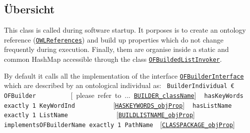 \subsection{Übersicht}
This class is called during software startup. It porposes is to create an ontology reference (\texttt{\hyperlink{ontologyFramework.OFContextManagement.OWLReferences-class}{OWLReferences}})
 and build up properties which do not change frequently during execution. 
 Finally, them are organise inside a static and common HashMap accessible through the
 class \texttt{\hyperlink{ontologyFramework.OFRunning.OFInvokingManager.OFBuildedListInvoker-class}{OFBuildedListInvoker}}.
 \par 
 By default it calls all the implementation of the interface \texttt{\hyperlink{ontologyFramework.OFRunning.OFInitialising.OFBuilderInterface<T>-class}{OFBuilderInterface}}
 which are described by an ontological individual as:
 {\ttfamily
\mbox{ }\verb!BuilderIndividual € OFBuilder !\mbox{ }\mbox{ }\mbox{ }\mbox{ }\mbox{ }\mbox{ }\mbox{ }\mbox{ }\mbox{ }[\mbox{ }please\mbox{ }refer\mbox{ }to\mbox{ }...\mbox{ }\texttt{\hyperlink{ontologyFramework.OFRunning.OFInitialising.OFInitialiser.BUILDER\_className}{BUILDER\_className}}]\mbox{}\newline
\mbox{ }		\verb!hasKeyWords exactly 1 KeyWordInd!\mbox{ }\mbox{ }\mbox{ }\mbox{ }\mbox{ }\mbox{ }\mbox{ }\mbox{ }\mbox{ }\mbox{ }\mbox{ }[\texttt{\hyperlink{ontologyFramework.OFRunning.OFInitialising.OFBuilderCommon.HASKEYWORDS\_objProp}{HASKEYWORDS\_objProp}}]\mbox{}\newline
\mbox{ }		\verb!hasListName exactly 1 ListName!\mbox{ }\mbox{ }\mbox{ }\mbox{ }\mbox{ }\mbox{ }\mbox{ }\mbox{ }\mbox{ }\mbox{ }\mbox{ }\mbox{ }\mbox{ }\mbox{ }[\texttt{\hyperlink{ontologyFramework.OFRunning.OFInitialising.OFBuilderCommon.BUILDLISTNAME\_objProp}{BUILDLISTNAME\_objProp}}]\mbox{}\newline
\mbox{ }		\verb!implementsOFBuilderName exactly 1 PathName!\mbox{ }\mbox{ }[\texttt{\hyperlink{ontologyFramework.OFRunning.OFInitialising.OFBuilderCommon.CLASSPACKAGE\_objProp}{CLASSPACKAGE\_objProp}}]\mbox{}\newline
\mbox{ }}

